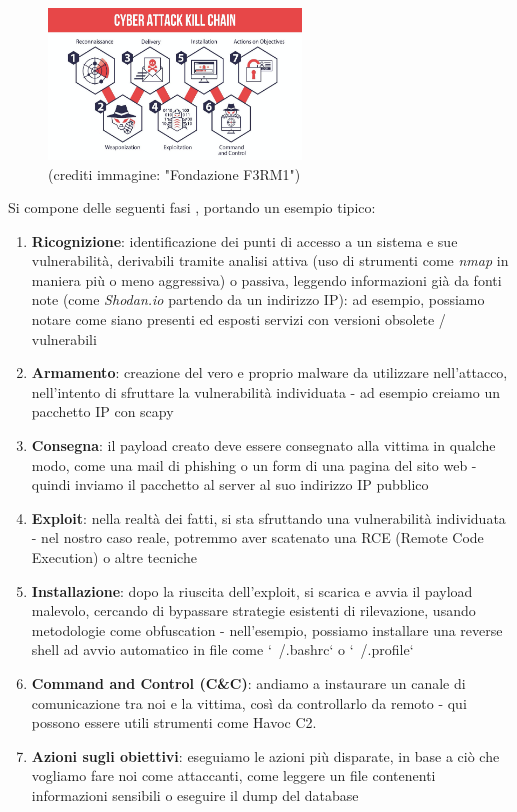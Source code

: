 \begin{figure}[h]
    \centering
    \includegraphics[width=0.6\textwidth]{assets/cyber_kill_chain.png}
    \caption{(crediti immagine: "Fondazione F3RM1")}
    \label{fig:cyber_kill_chain}
\end{figure}

Si compone delle seguenti fasi \cite{cyber_kill_chain_360}, portando un esempio tipico:
\begin{enumerate}
    \item \textbf{Ricognizione}: identificazione dei punti di accesso a un sistema e sue vulnerabilità, derivabili tramite analisi attiva (uso di strumenti come \emph{nmap} in maniera più o meno aggressiva) o passiva, leggendo informazioni già da fonti note (come \emph{Shodan.io} partendo da un indirizzo IP): ad esempio, possiamo notare come siano presenti ed esposti servizi con versioni obsolete / vulnerabili
    
    \item \textbf{Armamento}: creazione del vero e proprio malware da utilizzare nell'attacco, nell'intento di sfruttare la vulnerabilità individuata - ad esempio creiamo un pacchetto IP con scapy

    \item \textbf{Consegna}: il payload creato deve essere consegnato alla vittima in qualche modo, come una mail di phishing o un form di una pagina del sito web - quindi inviamo il pacchetto al server al suo indirizzo IP pubblico

    \item \textbf{Exploit}: nella realtà dei fatti, si sta sfruttando una vulnerabilità individuata - nel nostro caso reale, potremmo aver scatenato una RCE (Remote Code Execution) o altre tecniche

    \item \textbf{Installazione}: dopo la riuscita dell'exploit, si scarica e avvia il payload malevolo, cercando di bypassare strategie esistenti di rilevazione, usando metodologie come obfuscation - nell'esempio, possiamo installare una reverse shell ad avvio automatico in file come `~/.bashrc` o `~/.profile`

    \item \textbf{Command and Control (C\&C)}: andiamo a instaurare un canale di comunicazione tra noi e la vittima, così da controllarlo da remoto - qui possono essere utili strumenti come Havoc C2.

    \item \textbf{Azioni sugli obiettivi}: eseguiamo le azioni più disparate, in base a ciò che vogliamo fare noi come attaccanti, come leggere un file contenenti informazioni sensibili o eseguire il dump del database
\end{enumerate}

